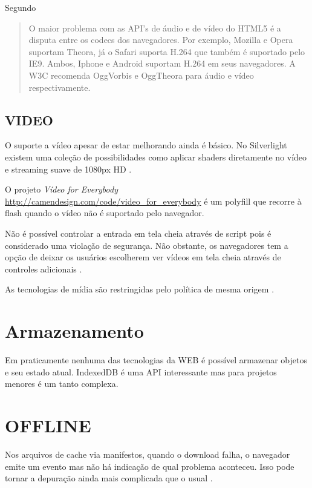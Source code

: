 Segundo \cite{html5Tradeoffs}
\begin{quote}
O maior problema com as API's de áudio e de vídeo do HTML5 é
a disputa entre os codecs dos navegadores. Por exemplo, Mozilla e
Opera suportam Theora, já o Safari suporta H.264 que também é
suportado pelo IE9. Ambos, Iphone e Android suportam H.264 em seus
navegadores. A W3C recomenda OggVorbis e OggTheora para áudio e vídeo
respectivamente.
\end{quote}

\subsection{VIDEO}

O suporte a vídeo apesar de estar melhorando ainda é básico. No
Silverlight existem uma coleção de possibilidades como aplicar shaders
diretamente no vídeo e streaming suave de 1080px HD \autocite[pp.
8]{researchOnHtml}.

O projeto \textit{Vídeo for Everybody}
\url{http://camendesign.com/code/video_for_everybody} é um polyfill que
recorre à flash quando o vídeo não é suportado pelo navegador.

Não é possível controlar a entrada em tela cheia através de script
pois é considerado uma violação de segurança. Não obstante,
os navegadores tem a opção de deixar os usuários escolherem ver
vídeos em tela cheia através de controles adicionais \autocite[pp.
68]{proHtml5}.

As tecnologias de mídia são restringidas pelo política de mesma
origem \autocite[pp. 68]{proHtml5}.

\section{Armazenamento}

Em praticamente nenhuma das tecnologias da WEB é possível armazenar objetos e  seu estado atual.
IndexedDB é uma API interessante mas para projetos menores é um tanto complexa.

\section{OFFLINE}

Nos arquivos de cache via manifestos, quando o download falha, o
navegador emite um evento mas não há indicação de qual problema
aconteceu. Isso pode tornar a depuração ainda mais complicada que o
usual \autocite{diveIntohtml}.

